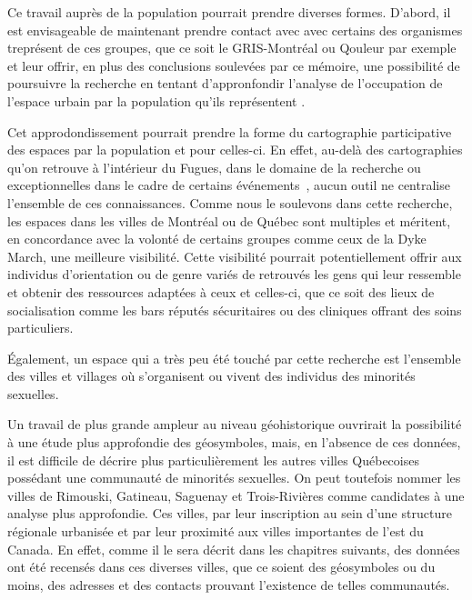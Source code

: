 Ce travail auprès de la population pourrait prendre diverses formes. 
D'abord, il est envisageable de maintenant prendre contact avec avec certains des organismes treprésent de ces groupes, que ce soit le GRIS-Montréal ou Qouleur par exemple et leur offrir, en plus des conclusions soulevées par ce mémoire, une possibilité de poursuivre la recherche en tentant d'appronfondir l'analyse de l'occupation de l'espace urbain par la population qu'ils représentent .

Cet approdondissement pourrait prendre la forme du cartographie participative des espaces \lgbt{} par la population et pour celles-ci.
En effet, au-delà des cartographies qu'on retrouve à l'intérieur du Fugues, dans le domaine de la recherche  ou exceptionnelles dans le cadre de certains événements~\parencite{Pervers/Cite2015}, aucun outil ne centralise l'ensemble de ces connaissances. 
Comme nous le soulevons dans cette recherche, les espaces \lgbt{} dans les villes de Montréal ou de Québec sont multiples et méritent, en concordance avec la volonté de certains groupes comme ceux de la Dyke March, une meilleure visibilité.
Cette visibilité pourrait potentiellement offrir aux individus d'orientation ou de genre variés de retrouvés les gens qui leur ressemble et obtenir des ressources adaptées à ceux et celles-ci, que ce soit des lieux de socialisation comme les bars réputés sécuritaires ou des cliniques offrant des soins particuliers.

Également, un espace qui a très peu été touché par cette recherche est l'ensemble des villes et villages où s'organisent ou vivent des individus des minorités sexuelles. 


Un travail de plus grande ampleur au niveau géohistorique ouvrirait la possibilité à une étude plus approfondie des géosymboles, mais, en l'absence de ces données, il est difficile de décrire plus particulièrement les autres villes Québecoises possédant une communauté de minorités sexuelles. 
On peut toutefois nommer les villes de Rimouski, Gatineau, Saguenay et Trois-Rivières comme candidates à une analyse plus approfondie. 
Ces villes, par leur inscription au sein d'une structure régionale urbanisée et par leur proximité aux villes importantes de l'est du Canada. 
En effet, comme il le sera décrit dans les chapitres suivants, des données ont été recensés dans ces diverses villes, que ce soient des géosymboles ou du moins, des adresses et des contacts prouvant l'existence de telles communautés.

